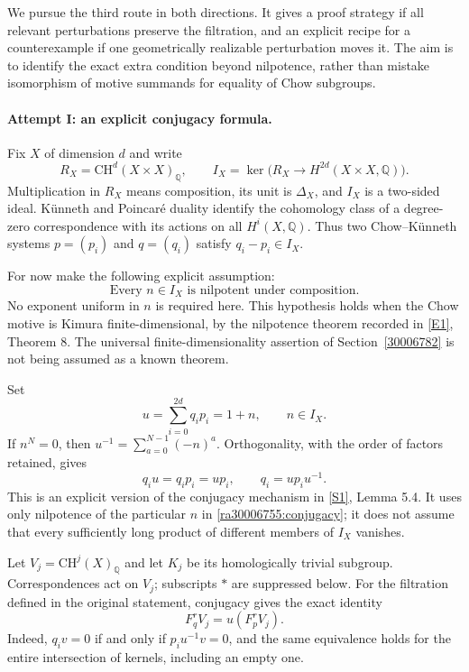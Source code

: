 \documentclass[11pt]{article}
\newcommand{\Q}{\mathbb{Q}}
\newcommand{\sref}[2]{\hyperlink{source:#1:#2}{[S#2]}}
\newcommand{\eref}[2]{\hyperlink{extra:#1:#2}{[E#2]}}
\begin{document}
We pursue the third route in both directions.  It gives a proof strategy if
all relevant perturbations preserve the filtration, and an explicit recipe
for a counterexample if one geometrically realizable perturbation moves it.
The aim is to identify the exact extra condition beyond nilpotence, rather
than mistake isomorphism of motive summands for equality of Chow subgroups.

\paragraph{Attempt I: an explicit conjugacy formula.}
Fix $X$ of dimension $d$ and write
\[
 R_X=\mathrm{CH}^d(X\times X)_{\Q},\qquad
 I_X=\ker\bigl(R_X\longrightarrow H^{2d}(X\times X,\Q)\bigr).
\]
Multiplication in $R_X$ means composition, its unit is $\Delta_X$, and $I_X$
is a two-sided ideal.  K\"unneth and Poincar\'e duality identify the cohomology
class of a degree-zero correspondence with its actions on all $H^i(X,\Q)$.
Thus two Chow--K\"unneth systems $p=(p_i)$ and $q=(q_i)$ satisfy
$q_i-p_i\in I_X$.

For now make the following explicit assumption:
\begin{equation}\label{ra30006755:nil}
 \text{Every $n\in I_X$ is nilpotent under composition.}
\end{equation}
No exponent uniform in $n$ is required here.  This hypothesis holds when the
Chow motive is Kimura finite-dimensional, by the nilpotence theorem recorded
in \eref{30006755}{1}, Theorem 8.  The universal finite-dimensionality assertion of
Section~\ref{30006782} is not being assumed as a known theorem.

Set
\begin{equation}\label{ra30006755:conjugacy}
 u=\sum_{i=0}^{2d}q_i p_i=1+n,\qquad n\in I_X.
\end{equation}
If $n^N=0$, then $u^{-1}=\sum_{a=0}^{N-1}(-n)^a$.  Orthogonality, with the
order of factors retained, gives
\[
 q_i u=q_i p_i=u p_i,
 \qquad q_i=u p_i u^{-1}.
\]
This is an explicit version of the conjugacy mechanism in
\sref{30006755}{1}, Lemma 5.4.  It uses only nilpotence of the particular $n$ in
\eqref{ra30006755:conjugacy}; it does not assume that every sufficiently long
product of different members of $I_X$ vanishes.

Let $V_j=\mathrm{CH}^j(X)_{\Q}$ and let $K_j$ be its homologically trivial
subgroup.  Correspondences act on $V_j$; subscripts $*$ are suppressed below.
For the filtration defined in the original statement, conjugacy gives the
exact identity
\begin{equation}\label{ra30006755:transport}
 F_q^r V_j=u(F_p^r V_j).
\end{equation}
Indeed, $q_i v=0$ if and only if $p_i u^{-1}v=0$, and the same equivalence
holds for the entire intersection of kernels, including an empty one.
\end{document}
